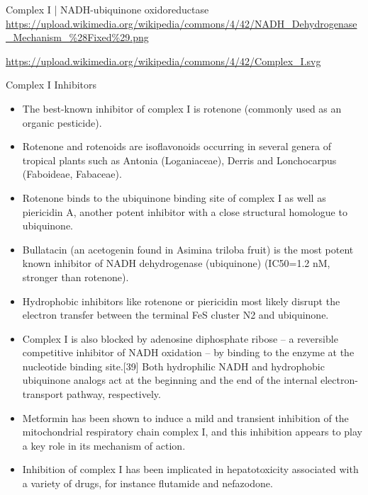 \documentclass[presentation, smaller]{beamer}
\begin{document}
\begin{frame}[label={sec:org68fdb76}]{Complex I | NADH-ubiquinone oxidoreductase}
\url{https://upload.wikimedia.org/wikipedia/commons/4/42/NADH\_Dehydrogenase\_Mechanism\_\%28Fixed\%29.png}

\url{https://upload.wikimedia.org/wikipedia/commons/4/42/Complex\_I.svg}
\end{frame}
\begin{frame}[label={sec:orgc51f90a}]{Complex I Inhibitors}
\begin{itemize}
\item The best-known inhibitor of complex I is rotenone (commonly used as an organic pesticide).
\item Rotenone and rotenoids are isoflavonoids occurring in several genera of tropical plants such as Antonia (Loganiaceae), Derris and Lonchocarpus (Faboideae, Fabaceae).
\item Rotenone binds to the ubiquinone binding site of complex I as well as piericidin A, another potent inhibitor with a close structural homologue to ubiquinone.
\item Bullatacin (an acetogenin found in Asimina triloba fruit) is the most potent known inhibitor of NADH dehydrogenase (ubiquinone) (IC50=1.2 nM, stronger than rotenone).

\item Hydrophobic inhibitors like rotenone or piericidin most likely disrupt the electron transfer between the terminal FeS cluster N2 and ubiquinone.

\item Complex I is also blocked by adenosine diphosphate ribose – a reversible competitive inhibitor of NADH oxidation – by binding to the enzyme at the nucleotide binding site.[39] Both hydrophilic NADH and hydrophobic ubiquinone analogs act at the beginning and the end of the internal electron-transport pathway, respectively.

\item Metformin has been shown to induce a mild and transient inhibition of the mitochondrial respiratory chain complex I, and this inhibition appears to play a key role in its mechanism of action.

\item Inhibition of complex I has been implicated in hepatotoxicity associated with a variety of drugs, for instance flutamide and nefazodone.
\end{itemize}
\end{frame}
\end{document}
